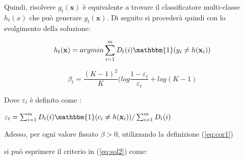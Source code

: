 Quindi, risolvere \begin{math}g_t(\textbf{x})\end{math} \`e equivalente a trovare il classificatore multi-classe 
\begin{math}h_t(x)\end{math} che pu\`o generare \begin{math}g_t(\textbf{x})\end{math}. Di seguito si proceder\`a 
quindi con lo svolgimento della soluzione:
\begin{center}
\begin{equation}\label{eq:T_m}
 h_t (\textbf{x})= argmin  \sum_{i=1}^m D_t(i) \mathbbm{1}(y_i\ne h(\textbf{x}_i))
\end{equation}                                                                      
\end{center}
\begin{center}
\begin{equation}\label{eq:beta_m}
\beta_t = \frac{(K-1)^2}{K} ( log \frac{1-\varepsilon_t}{\varepsilon_t} + log(K-1)
\end{equation}                                                                      
\end{center}
Dove \begin{math}\varepsilon_t\end{math} \`e definito come :
\begin{center}
\begin{math}
 \varepsilon_t = \sum_{i=1}^m D_t(i) \mathbbm{1}(c_i\ne h(\textbf{x}_i))/\sum_{i=1}^m D_t(i)
\end{math}                                                                      
\end{center}
Adesso, per ogni valore fissato \begin{math}
                                 \beta >0
                                \end{math}, utilizzando la definizione (\ref{eq:cor1})
 
si pu\`o esprimere il criterio in (\ref{eq:sol2}) come:

